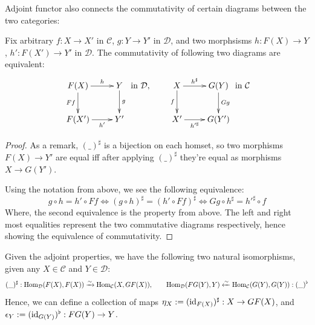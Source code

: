 \documentclass{article}
\begin{document}
\hfil

Adjoint functor also connects the commutativity of certain diagrams between the two categories:

\begin{lem}
Fix arbitrary $f:X\rightarrow X'$ in $\mathcal{C}$, $g:Y\rightarrow Y'$ in $\mathcal{D}$, and two morphsisms $h:F(X)\rightarrow Y$, $h':F(X')\rightarrow Y'$ in $\mathcal{D}$. The commutativity of following two diagrams are equivalent:
\[\xymatrix{
    F(X) \ar[d]_-{Ff} \ar[r]^-{h} & Y \ar[d]^-{g}\\
    F(X')\ar[r]_-{h'} & Y'
} \text{ in }\mathcal{D},\quad \quad \xymatrix{
    X \ar[d]_-{f} \ar[r]^-{h^\sharp} & G(Y) \ar[d]^-{Gg}\\
    X'\ar[r]_-{h'^\sharp} & G(Y')
} \text{ in }\mathcal{C}\]
\end{lem}
\begin{proof}
    As a remark, $(\_)^\sharp$ is a bijection on each homset, so two morphisms $F(X)\rightarrow Y'$ are equal iff after applying $(\_)^\sharp$ they're equal as morphisms $X\rightarrow G(Y')$. 
    
    Using the notation from above, we see the following equivalence:
    \[g\circ h=h'\circ Ff \iff (g\circ h)^\sharp = (h'\circ Ff)^\sharp \iff Gg\circ h^\sharp = h'^\sharp \circ f \]
    Where, the second equivalence is the property from above. The left and right most equalities represent the two commutative diagrams respectively, hence showing the equivalence of commutativity.
\end{proof}

\hfil

Given the adjoint properties, we have the following two natural isomorphisms, given any $X\in\mathcal{C}$ and $Y\in\mathcal{D}$:
\[(\_)^\sharp:\mathrm{Hom}_\mathcal{D}(F(X),F(X))\xrightarrow{\sim} \mathrm{Hom}_\mathcal{C}(X,GF(X)),\quad\quad \mathrm{Hom}_\mathcal{D}(FG(Y),Y)\xleftarrow{\sim} \mathrm{Hom}_\mathcal{C}(G(Y),G(Y)):(\_)^\flat\]
Hence, we can define a collection of maps $\eta_X := (\mathrm{id}_{F(X)})^\sharp:X\rightarrow GF(X)$, and $\epsilon_Y := (\mathrm{id}_{G(Y)})^\flat:FG(Y)\rightarrow Y$.
\end{document}
